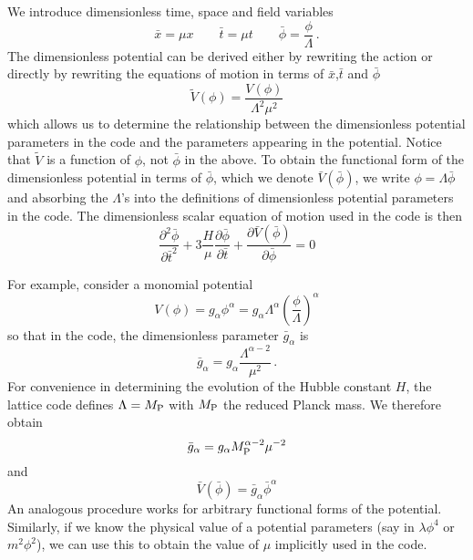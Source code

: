 \documentclass{revtex4}
\begin{document}
We introduce dimensionless time, space and field variables
\begin{equation}
  \bar{x} = \mu x \qquad \bar{t} = \mu t \qquad \bar{\phi} = \frac{\phi}{\Lambda} \, .
\end{equation}
The dimensionless potential can be derived either by rewriting the action or directly by rewriting the equations of motion in terms of $\bar{x}$,$\bar{t}$ and $\bar{\phi}$
\begin{equation}
  \tilde{V}(\phi) = \frac{V(\phi)}{\Lambda^2 \mu^2}
\end{equation}
which allows us to determine the relationship between the dimensionless potential parameters in the code and the parameters appearing in the potential.
Notice that $\tilde{V}$ is a function of $\phi$, not $\bar{\phi}$ in the above.
To obtain the functional form of the dimensionless potential in terms of $\bar{\phi}$, which we denote $\bar{V}(\bar{\phi})$, we write $\phi = \Lambda\bar{\phi}$ and absorbing the $\Lambda$'s into the definitions of dimensionless potential parameters in the code.
The dimensionless scalar equation of motion used in the code is then
\begin{equation}
  \frac{\partial^2\bar{\phi}}{\partial\bar{t}^2} + 3\frac{H}{\mu}\frac{\partial\bar{\phi}}{\partial\bar{t}} + \frac{\partial\bar{V}(\bar{\phi})}{\partial\bar{\phi}} = 0
\end{equation}

For example, consider a monomial potential
\begin{equation}
  V(\phi) = g_\alpha \phi^\alpha = g_\alpha\Lambda^\alpha\left(\frac{\phi}{\Lambda}\right)^\alpha
\end{equation}
so that in the code, the dimensionless parameter $\bar{g}_\alpha$ is
\begin{equation}
  \bar{g}_{\alpha} = g_{\alpha}\frac{\Lambda^{\alpha-2}}{\mu^2} \, .
\end{equation}
For convenience in determining the evolution of the Hubble constant $H$, the lattice code defines $\Lambda = M_{\rm P}$ with $M_{\rm P}$ the reduced Planck mass.  We therefore obtain
\begin{equation}
  \bar{g}_{\alpha} = g_{\alpha}M_{\rm P}^{\alpha-2}\mu^{-2}
\end{equation}
and
\begin{equation}
  \bar{V}(\bar{\phi}) = \bar{g}_{\alpha}\bar{\phi}^\alpha
\end{equation}
An analogous procedure works for arbitrary functional forms of the potential.
Similarly, if we know the physical value of a potential parameters (say in $\lambda\phi^4$ or $m^2\phi^2$), we can use this to obtain the value of $\mu$ implicitly used in the code.
\end{document}
